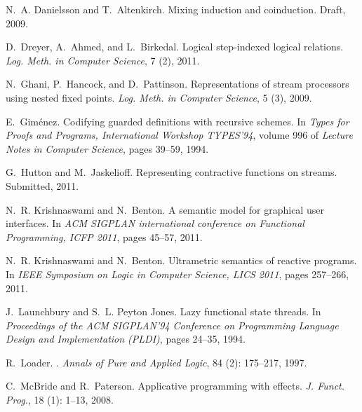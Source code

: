 \documentclass[natbib]{sigplanconf}
\begin{document}
\begin{thebibliography}{24}
N.~A. Danielsson and T.~Altenkirch.
\newblock Mixing induction and coinduction.
\newblock Draft, 2009.

D.~Dreyer, A.~Ahmed, and L.~Birkedal.
\newblock Logical step-indexed logical relations.
\newblock \emph{Log. Meth. in Computer Science}, 7 (2), 2011.

N.~Ghani, P.~Hancock, and D.~Pattinson.
\newblock Representations of stream processors using nested fixed points.
\newblock \emph{Log. Meth. in Computer Science}, 5 (3), 2009.

E.~Gim{\'e}nez.
\newblock Codifying guarded definitions with recursive schemes.
\newblock In \emph{Types for Proofs and Programs, International Workshop
  TYPES'94}, volume 996 of \emph{Lecture Notes in Computer Science}, pages
  39--59, 1994.

G.~Hutton and M.~Jaskelioff.
\newblock Representing contractive functions on streams.
\newblock Submitted, 2011.

N.~R. Krishnaswami and N.~Benton.
\newblock A semantic model for graphical user interfaces.
\newblock In \emph{ACM SIGPLAN international conference on Functional
  Programming, ICFP 2011}, pages 45--57, 2011{}.

N.~R. Krishnaswami and N.~Benton.
\newblock Ultrametric semantics of reactive programs.
\newblock In \emph{IEEE Symposium on Logic in Computer Science, LICS 2011},
  pages 257--266, 2011{}.

J.~Launchbury and S.~L. {Peyton Jones}.
\newblock Lazy functional state threads.
\newblock In \emph{Proceedings of the ACM SIGPLAN'94 Conference on Programming
  Language Design and Implementation (PLDI)}, pages 24--35, 1994.

R.~Loader.
.
\newblock \emph{Annals of Pure and Applied Logic}, 84 (2):
  175--217, 1997.

C.~McBride and R.~Paterson.
\newblock Applicative programming with effects.
\newblock \emph{J. Funct. Prog.}, 18 (1): 1--13, 2008.


\end{thebibliography}
\end{document}
